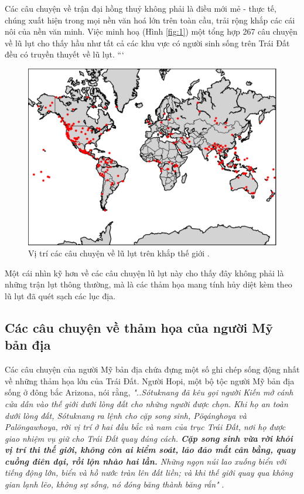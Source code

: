 \documentclass[10pt,twocolumn,letterpaper]{article}
\begin{document}
Các câu chuyện về trận đại hồng thuỷ không phải là điều mới mẻ - thực tế, chúng xuất hiện trong mọi nền văn hoá lớn trên toàn cầu, trải rộng khắp các cái nôi của nền văn minh. Việc minh hoạ (Hình \ref{fig:1}) một tổng hợp 267 câu chuyện về lũ lụt \cite{3} cho thấy hầu như tất cả các khu vực có người sinh sống trên Trái Đất đều có truyền thuyết về lũ lụt.
```
\begin{figure}[h]
\begin{center}
   \includegraphics[width=1\linewidth]{b.png}
\end{center}
   \caption{Vị trí các câu chuyện về lũ lụt trên khắp thế giới \cite{3}.}
\label{fig:1}
\label{fig:onecol}
\end{figure}

Một cái nhìn kỹ hơn về các câu chuyện lũ lụt này cho thấy đây không phải là những trận lụt thông thường, mà là các thảm họa mang tính hủy diệt kèm theo lũ lụt đã quét sạch các lục địa.

\subsection{Các câu chuyện về thảm họa của người Mỹ bản địa}

Các câu chuyện của người Mỹ bản địa chứa đựng một số ghi chép sống động nhất về những thảm họa lớn của Trái Đất. Người Hopi, một bộ tộc người Mỹ bản địa sống ở đông bắc Arizona, nói rằng, \textit{"..Sótuknang đã kêu gọi người Kiến mở cánh cửa dẫn vào thế giới dưới lòng đất cho những người được chọn. Khi họ an toàn dưới lòng đất, Sótuknang ra lệnh cho cặp song sinh, Pöqánghoya và Palöngawhoya, rời vị trí ở hai đầu bắc và nam của trục Trái Đất, nơi họ được giao nhiệm vụ giữ cho Trái Đất quay đúng cách. \textbf{Cặp song sinh vừa rời khỏi vị trí thì thế giới, không còn ai kiểm soát, lảo đảo mất cân bằng, quay cuồng điên dại, rồi lộn nhào hai lần.} Những ngọn núi lao xuống biển với tiếng động lớn, biển và hồ nước tràn lên đất liền; và khi thế giới quay qua không gian lạnh lẽo, không sự sống, nó đóng băng thành băng rắn"} \cite{4}.
\end{document}
